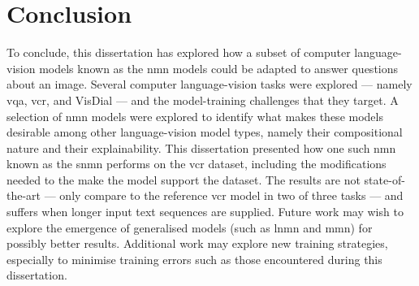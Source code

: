 \chapter{Conclusion}
\label{chp:conclusion}

To conclude, this dissertation has explored how a subset of computer language-vision models known as the \gls{nmn} models could be adapted to answer questions about an image.
Several computer language-vision tasks were explored --- namely \gls{vqa}, \gls{vcr}, and VisDial --- and the model-training challenges that they target.
A selection of \gls{nmn} models were explored to identify what makes these models desirable among other language-vision model types, namely their compositional nature and their explainability.
This dissertation presented how one such \gls{nmn} known as the \gls{snmn} performs on the \gls{vcr} dataset, including the modifications needed to the make the model support the dataset.
The results are not state-of-the-art --- only compare to the reference \gls{vcr} model in two of three tasks --- and suffers when longer input text sequences are supplied.
Future work may wish to explore the emergence of generalised models (such as \gls{lnmn} and \gls{mmn}) for possibly better results.
Additional work may explore new training strategies, especially to minimise training errors such as those encountered during this dissertation.
